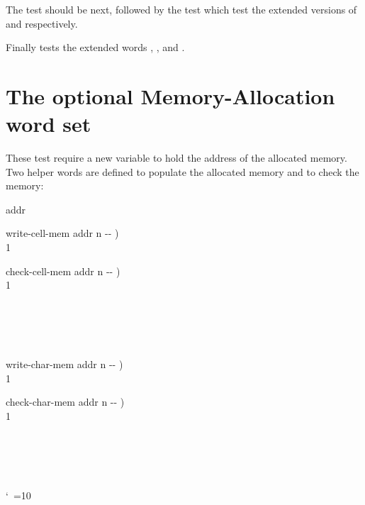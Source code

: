The  test should be next, followed by
 the test which test the extended versions of
 and  respectively.

Finally  tests the extended words
, , and .





\section{The optional Memory-Allocation word set} %
\label{test:memory}

These test require a new variable to hold the address of the allocated
memory.  Two helper words are defined to populate the allocated memory
and to check the memory:

\begin{tt}\frenchspacing\obeyspaces
{} addr

\word{:} write-cell-mem  addr n -{}- ) \\
\tab {} 1    \word{!}    \\
\word{;}

\word{:} check-cell-mem  addr n -{}- ) \\
\tab {} 1  \\
\tab[2]     \\
\tab[2]  \\
\tab[2]   \\
\tab {}  \\
\word{;}

\word{:} write-char-mem  addr n -{}- ) \\
\tab {} 1        \\
\word{;}

\word{:} check-char-mem  addr n -{}- ) \\
\tab {} 1  \\
\tab[2]     \\
\tab[2]  \\
\tab[2]   \\
\tab {}  \\
\word{;}
\end{tt}
\nonfrenchspacing\catcode`\ =10

